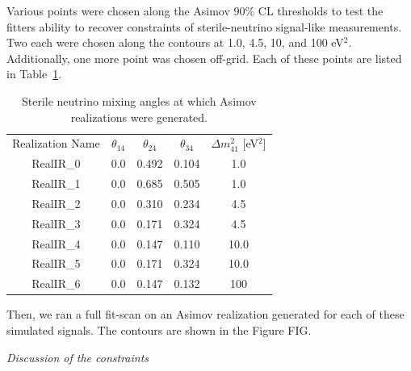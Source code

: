 \documentclass[main.tex]{subfiles}
\begin{document}
Various points were chosen along the Asimov 90\% CL thresholds to test the fitters ability to recover constraints of sterile-neutrino signal-like measurements. 
Two each were chosen along the contours at 1.0, 4.5, 10, and 100 eV$^{2}$. 
Additionally, one more point was chosen off-grid. 
Each of these points are listed in Table~\ref{table:injected_signals}.

\begin{table}
    \centering
    \begin{tabular}{c | cccc}\rowcolor{blue!25}
            Realization Name & $\theta_{14}$ & $\theta_{24}$ & $\theta_{34}$ & $\Delta m_{41}^{2}$ [eV$^{2}$] \\
            RealIR\_0 & 0.0 & 0.492 & 0.104 & 1.0 \\
            RealIR\_1 & 0.0 & 0.685 & 0.505 & 1.0 \\
            RealIR\_2 & 0.0 & 0.310 & 0.234 & 4.5 \\
            RealIR\_3 & 0.0 & 0.171 & 0.324 & 4.5 \\
            RealIR\_4 & 0.0 & 0.147 & 0.110 & 10.0 \\
            RealIR\_5 & 0.0 & 0.171 & 0.324 & 10.0 \\
            RealIR\_6 & 0.0 & 0.147 & 0.132 & 100 
    \end{tabular}
    \caption{Sterile neutrino mixing angles at which Asimov realizations were generated.}\label{table:injected_signals}
\end{table}

Then, we ran a full fit-scan on an Asimov realization generated for each of these simulated signals. 
The contours are shown in the Figure FIG. 


\textit{Discussion of the constraints}
\end{document}
